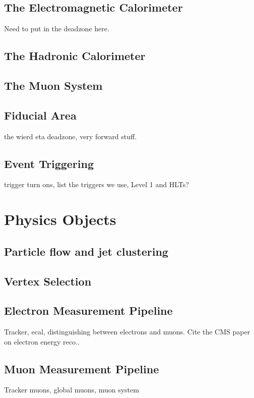   \subsection{The Electromagnetic Calorimeter} \label{sec:ECAL}
    Need to put in the deadzone here.
  \subsection{The Hadronic Calorimeter}
  \subsection{The Muon System}
  \subsection{Fiducial Area} \label{sec:fiducial_area}
    the wierd eta deadzone, very forward stuff.
  \subsection{Event Triggering} \label{sec:event_triggering}
    trigger turn ons, list the triggers we use, Level 1 and HLTs?


\section{Physics Objects}
  \subsection{Particle flow and jet clustering} \label{sec:particle_flow}
  \subsection{Vertex Selection}
  \subsection{Electron Measurement Pipeline} \label{sec:electron_measurement_pipeline}
    Tracker, ecal, distinguishing between electrons and muons. Cite the CMS paper on electron energy reco..
  \subsection{Muon Measurement Pipeline} \label{sec:muon_measurement_pipeline}
    Tracker muons, global muons, muon system
